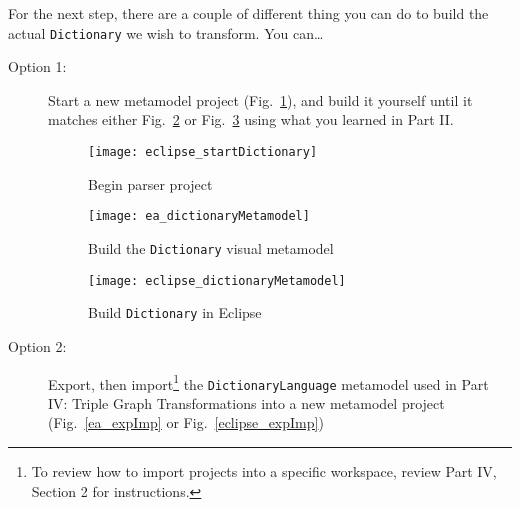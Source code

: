 For the next step, there are a couple of different thing you can do to build the actual \texttt{Dictionary} we wish to transform. You can\ldots
\begin{description}


\item[Option 1:] Start a new metamodel project (Fig.~\ref{fig:startDictLang}), and build it yourself until it matches either Fig.~\ref{ea_dictLang} or
Fig.~\ref{eclipse_dictLang} using what you learned in Part II.	

\begin{figure}[htbp]
\begin{center}
  \texttt{[image: eclipse\_startDictionary]}
  \caption{Begin parser project}
  \label{fig:startDictLang}
\end{center}
\end{figure}

\newpage

\vspace*{1cm}

\begin{figure}[htb]
\begin{center}
  \texttt{[image: ea\_dictionaryMetamodel]}
  \caption{Build the \texttt{Dictionary} visual metamodel}
  \label{ea_dictLang}
\end{center}
\end{figure}

\vspace{1cm}

\begin{figure}[htb]
\begin{center}
  \texttt{[image: eclipse\_dictionaryMetamodel]}
  \caption{Build \texttt{Dictionary} in Eclipse}
  \label{eclipse_dictLang}
\end{center}
\end{figure}

\newpage


\item[Option 2:] Export, then import\footnote{To review how to import projects into a specific workspace, review Part IV, Section 2 for instructions.} the
\texttt{DictionaryLanguage} metamodel used in Part IV: Triple Graph Transformations into a new metamodel project (Fig.~\ref{ea_expImp} or
Fig.~\ref{eclipse_expImp})

\vspace{0.5cm}


\end{description}
